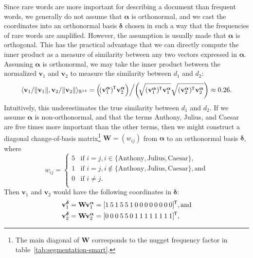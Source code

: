 \documentclass[
  digital, %
  notable, %
  lof,     %
  lot,     %
  nopalatino, color
]{fithesis3}
\newcommand*{\tran}{^{\mkern-1.5mu\mathsf{T}}}
\let\note=\footnote
\begin{document}
Since rare words are more important for describing a document than frequent
words, we generally do not assume that $\bm\alpha$ is orthonormal, and we
cast the coordinates into an orthonormal basis $\bm\delta$
chosen in such a way that the frequencies of rare words are amplified. However,
the assumption is usually made that $\bm\alpha$ is orthogonal. This has the
practical advantage that we can directly compute the inner product as a measure
of similarity between any two vectors expressed in $\bm\alpha$. Assuming
$\bm\alpha$ is orthonormal, we may take the inner product between the
normalized $\mathbf v_1$ and $\mathbf v_2$ to measure the similarity between
$d_1$ and $d_2$:
\begin{equation*}
  \langle\mathbf v_1/\Vert \mathbf v_1\Vert, \mathbf v_2/\Vert\mathbf
  v_2\Vert\rangle_{\mathbb{R}^{14}} = \Big(\!(\mathbf v_1^{\bm\alpha})\tran \mathbf v_2^{\bm\alpha}\Big) \Big/ \!
  \left(\!\sqrt{\mathbf (\mathbf v_1^{\bm\alpha})\tran \mathbf
  v_1^{\bm\alpha}}\sqrt{\mathbf (\mathbf v_2^{\bm\alpha})\tran \mathbf
  v_2^{\bm\alpha}}\right)\approx0.26.
\end{equation*}
Intuitively, this underestimates the true similarity between $d_1$ and $d_2$.
If we assume $\bm\alpha$ is non-orthonormal, and that the terms Anthony, Julius, and
Caesar are five times more important than the other terms, then we might construct
a diagonal change-of-basis matrix\note{%
The main diagonal of $\mathbf W$ corresponds to the
nugget frequency factor in table~\ref{tab:segmentation-smart}.} $\mathbf W =
(w_{ij})$ from $\bm\alpha$ to an orthonormal basis
$\bm\delta$, where
\begin{equation}
  \label{eq:similarity-W}
  w_{ij} = \begin{cases}
    5 & \text{if } i = j, i \in\{\textrm{Anthony}, \textrm{Julius}, \textrm{Caesar}\}, \\
    1 & \text{if } i = j, i \not\in\{\textrm{Anthony}, \textrm{Julius}, \textrm{Caesar}\}, \text{and} \\
    0 & \text{if } i \not= j. \\
  \end{cases}
\end{equation}
Then $\mathbf v_1$ and $\mathbf v_2$ would have the following coordinates in
$\bm\delta$:
\begin{align*}
  \mathbf v_1^{\bm\delta} &= \mathbf W \mathbf v_1^{\bm\alpha} = [1\:5\:1\:5\:5\:1\:0\:0\:0\:0\:0\:0\:0\:0]\tran, \text{and} \\
  \mathbf v_2^{\bm\delta} &= \mathbf W \mathbf v_2^{\bm\alpha} = [0\:0\:0\:5\:5\:0\:1\:1\:1\:1\:1\:1\:1\:1]\tran,
\end{align*}
\end{document}
